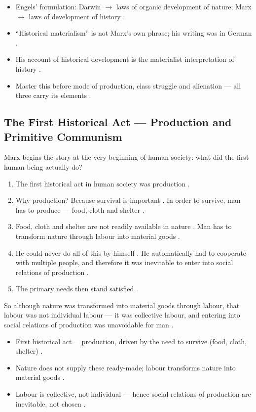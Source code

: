 \begin{QuickRevision}
\begin{itemize}
    \item Engels' formulation: Darwin $\rightarrow$ laws of organic development of nature; Marx $\rightarrow$ laws of development of history .
    \item ``Historical materialism'' is not Marx's own phrase; his writing was in German .
    \item His account of historical development is the materialist interpretation of history .
    \item Master this before mode of production, class struggle and alienation --- all three carry its elements .
\end{itemize}
\end{QuickRevision}

\subsection{The First Historical Act --- Production and Primitive Communism}
Marx begins the story at the very beginning of human society: what did the first human being actually do? 
\begin{enumerate}
    \item The first historical act in human society was production .
    \item Why production? Because survival is important . In order to survive, man has to produce --- food, cloth and shelter .
    \item Food, cloth and shelter are not readily available in nature . Man has to transform nature through labour into material goods .
    \item He could never do all of this by himself . He automatically had to cooperate with multiple people, and therefore it was inevitable to enter into social relations of production .
    \item The primary needs then stand satisfied .
\end{enumerate}
So although nature was transformed into material goods through labour, that labour was not individual labour --- it was collective labour, and entering into social relations of production was unavoidable for man .

\begin{KeyConcept}
\begin{itemize}
    \item First historical act = production, driven by the need to survive (food, cloth, shelter) .
    \item Nature does not supply these ready-made; labour transforms nature into material goods .
    \item Labour is collective, not individual --- hence social relations of production are inevitable, not chosen .
\end{itemize}
\end{KeyConcept}


